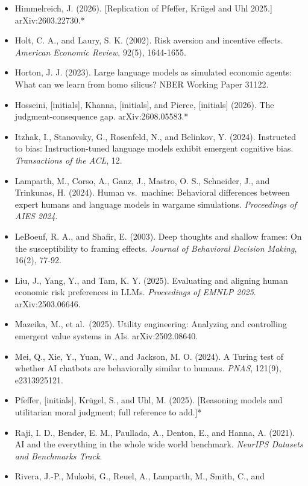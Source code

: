 \documentclass[
  11pt,
]{article}
\begin{document}
\begin{itemize}
{  Science}, 3, 833-838.
\item
  Himmelreich, J. (2026). {[}Replication of Pfeffer, Krügel and Uhl
  2025.{]} arXiv:2603.22730.*
\item
  Holt, C. A., and Laury, S. K. (2002). Risk aversion and incentive
  effects. \emph{American Economic Review}, 92(5), 1644-1655.
\item
  Horton, J. J. (2023). Large language models as simulated economic
  agents: What can we learn from homo silicus? NBER Working Paper 31122.
\item
  Hosseini, {[}initials{]}, Khanna, {[}initials{]}, and Pierce,
  {[}initials{]} (2026). The judgment-consequence gap.
  arXiv:2608.05583.*
\item
  Itzhak, I., Stanovsky, G., Rosenfeld, N., and Belinkov, Y. (2024).
  Instructed to bias: Instruction-tuned language models exhibit emergent
  cognitive bias. \emph{Transactions of the ACL}, 12.
\item
  Lamparth, M., Corso, A., Ganz, J., Mastro, O. S., Schneider, J., and
  Trinkunas, H. (2024). Human vs.~machine: Behavioral differences
  between expert humans and language models in wargame simulations.
  \emph{Proceedings of AIES 2024}.
\item
  LeBoeuf, R. A., and Shafir, E. (2003). Deep thoughts and shallow
  frames: On the susceptibility to framing effects. \emph{Journal of
  Behavioral Decision Making}, 16(2), 77-92.
\item
  Liu, J., Yang, Y., and Tam, K. Y. (2025). Evaluating and aligning
  human economic risk preferences in LLMs. \emph{Proceedings of EMNLP
  2025}. arXiv:2503.06646.
\item
  Mazeika, M., et al.~(2025). Utility engineering: Analyzing and
  controlling emergent value systems in AIs. arXiv:2502.08640.
\item
  Mei, Q., Xie, Y., Yuan, W., and Jackson, M. O. (2024). A Turing test
  of whether AI chatbots are behaviorally similar to humans.
  \emph{PNAS}, 121(9), e2313925121.
\item
  Pfeffer, {[}initials{]}, Krügel, S., and Uhl, M. (2025). {[}Reasoning
  models and utilitarian moral judgment; full reference to add.{]}*
\item
  Raji, I. D., Bender, E. M., Paullada, A., Denton, E., and Hanna, A.
  (2021). AI and the everything in the whole wide world benchmark.
  \emph{NeurIPS Datasets and Benchmarks Track}.
\item
  Rivera, J.-P., Mukobi, G., Reuel, A., Lamparth, M., Smith, C., and

\end{itemize}
\end{document}
